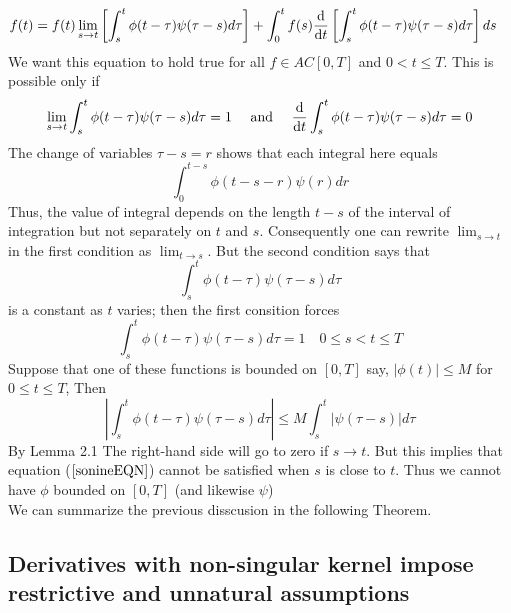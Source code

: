 \documentclass[twoside]{book}
\begin{document}
{\begin{align*}
    f(t) & =f(t) \lim_{s \to t}\left[\int_s^t \phi(t-\tau) \psi(\tau -s) d\tau  \right] + \int_0^t f(s) \dv{}{t} \left[ \int_s^t  \phi(t-\tau) \psi(\tau-s) d\tau \right] ds
\end{align*}
We want this equation to hold true for all $f \in AC[0,T]$ and $0<t\leq T$. This is possible only if
$$ \lim_{s \to t} \int_s^t \phi(t-\tau) \psi(\tau -s) d\tau = 1 \quad\text{ and }\quad \dv{}{t} \int_s^t  \phi(t-\tau) \psi(\tau-s) d\tau =0 $$
The change of variables $\tau -s = r$ shows that each integral here equals
$$\int_0^{t-s} \phi(t-s -r)\psi(r) dr$$
Thus, the value of integral depends on the length $t-s$ of the interval of integration but not separately on $t$ and $s$. Consequently one can rewrite  $\lim_{s \to t}$ in the first condition as $\lim_{t \to s}$. But the second condition says that
$$\int_s^t \phi(t-\tau) \psi(\tau-s) d\tau $$
is a constant as $t$ varies; then the first consition forces
\begin{equation}
    \label{sonineEQN}
    \int_s^t \phi(t-\tau) \psi(\tau-s) d\tau =1    \quad 0\leq s < t \leq T
\end{equation}
Suppose that one of these functions is bounded on $[0,T]$ say, $|\phi(t)|\leq M$ for $0\leq t\leq T$, Then
$$\left|\int_s^t \phi(t-\tau)\psi(\tau-s) d\tau \right| \leq M \int_s^t \left|\psi(\tau -s ) \right| d\tau$$
By Lemma 2.1 The right-hand side will go to zero if $s \to t$. But this implies that equation ($\ref{sonineEQN}$) cannot be satisfied when $s$ is close to $t$. Thus we cannot have $\phi$ bounded on $[0,T]$ (and likewise $\psi$)\\
We can summarize the previous disscusion in the following Theorem.\\
\subsection*{Derivatives with non-singular kernel impose restrictive and unnatural assumptions}

}
\end{document}

